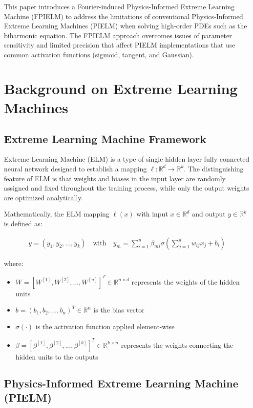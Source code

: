 \documentclass[11pt]{article}
\begin{document}
This paper introduces a Fourier-induced Physics-Informed Extreme Learning Machine (FPIELM) to address the limitations of conventional Physics-Informed Extreme Learning Machines (PIELM) when solving high-order PDEs such as the biharmonic equation. The FPIELM approach overcomes issues of parameter sensitivity and limited precision that affect PIELM implementations that use common activation functions (sigmoid, tangent, and Gaussian).

\section{Background on Extreme Learning Machines}

\subsection{Extreme Learning Machine Framework}

Extreme Learning Machine (ELM) is a type of single hidden layer fully connected neural network designed to establish a mapping $\ell: \mathbb{R}^d \to \mathbb{R}^k$. The distinguishing feature of ELM is that weights and biases in the input layer are randomly assigned and fixed throughout the training process, while only the output weights are optimized analytically.

Mathematically, the ELM mapping $\ell(x)$ with input $x \in \mathbb{R}^d$ and output $y \in \mathbb{R}^k$ is defined as:

\begin{align}
    y = (y_1, y_2, \ldots, y_k) \quad \text{with} \quad y_m = \sum_{i=1}^{n} \beta_{mi} \sigma\left(\sum_{j=1}^{d} w_{ij} x_j + b_i\right)
\end{align}

where:
\begin{itemize}
    \item $W = [W^{[1]}, W^{[2]}, \ldots, W^{[n]}]^T \in \mathbb{R}^{n \times d}$ represents the weights of the hidden units
    \item $b = (b_1, b_2, \ldots, b_n)^T \in \mathbb{R}^n$ is the bias vector
    \item $\sigma(\cdot)$ is the activation function applied element-wise
    \item $\beta = [\beta^{[1]}, \beta^{[2]}, \ldots, \beta^{[k]}]^T \in \mathbb{R}^{k \times n}$ represents the weights connecting the hidden units to the outputs
\end{itemize}

\subsection{Physics-Informed Extreme Learning Machine (PIELM)}
\end{document}
